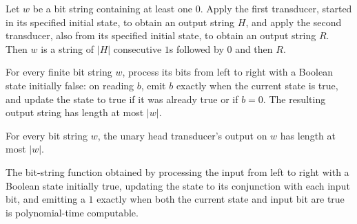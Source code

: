 \begin{theorem}
\label{Complexity.BinArith.eq_encodeNat_of_hasFalse}
\leanok
{}
Let $w$ be a bit string containing at least one $0$. Apply the first transducer, started
in its specified initial state, to obtain an output string $H$, and apply the second
transducer, also from its specified initial state, to obtain an output string $R$. Then
$w$ is a string of $|H|$ consecutive $1$s followed by $0$ and then $R$.
\end{theorem}

\begin{theorem}
\label{Complexity.BinArith.length_uRest_le}
\leanok
{}
For every finite bit string $w$, process its bits from left to right with a Boolean
state initially false: on reading $b$, emit $b$ exactly when the current state is true,
and update the state to true if it was already true or if $b=0$. The resulting output
string has length at most $|w|$.
\end{theorem}

\begin{theorem}
\label{Complexity.BinArith.length_uHead_le}
\leanok
{}
For every bit string $w$, the unary head transducer's output on $w$ has length at most
$|w|$.
\end{theorem}

\begin{theorem}
\label{Complexity.BinArith.polyTimeComputable_uHead}
\leanok
{}
The bit-string function obtained by processing the input from left to right with a
Boolean state initially true, updating the state to its conjunction with each input bit,
and emitting a $1$ exactly when both the current state and input bit are true is
polynomial-time computable.
\end{theorem}

